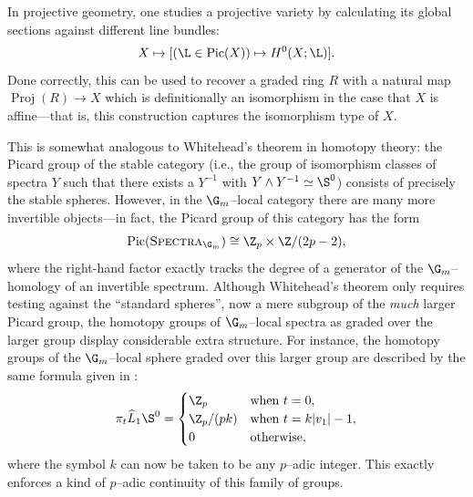 In projective geometry, one studies a projective variety by calculating its global sections against different line bundles: \[X \mapsto [(\L \in \Pic(X)) \mapsto H^0(X; \L)].\]
Done correctly, this can be used to recover a graded ring \(R\) with a natural map \(\operatorname{Proj}(R) \to X\) which is definitionally an isomorphism in the case that \(X\) is affine---that is, this construction captures the isomorphism type of \(X\).

This is somewhat analogous to Whitehead's theorem in homotopy theory: the Picard group of the stable category (i.e., the group of isomorphism classes of spectra \(Y\) such that there exists a \(Y^{-1}\) with \(Y \sm Y^{-1} \simeq \S^0\)) consists of precisely the stable spheres.
However, in the \(\G_m\)--local category there are many more invertible objects---in fact, the Picard group of this category has the form \[\operatorname{Pic}(\CatOf{Spectra}_{\G_m}) \cong \Z_p \times \Z / (2p-2),\] where the right-hand factor exactly tracks the degree of a generator of the \(\G_m\)--homology of an invertible spectrum.
Although Whitehead's theorem only requires testing against the ``standard spheres'', now a mere subgroup of the \emph{much} larger Picard group, the homotopy groups of \(\G_m\)--local spectra as graded over the larger group display considerable extra structure.
For instance, the homotopy groups of the \(\G_m\)--local sphere graded over this larger group are described by the same formula given in : \[\pi_t \widehat L_1 \S^0 = \begin{cases} \Z_p & \text{when \(t = 0\)}, \\ \Z_p / (pk) & \text{when \(t = k|v_1| - 1\)}, \\ 0 & \text{otherwise}, \end{cases}\] where the symbol \(k\) can now be taken to be any \(p\)--adic integer.
This exactly enforces a kind of \(p\)--adic continuity of this family of groups.

